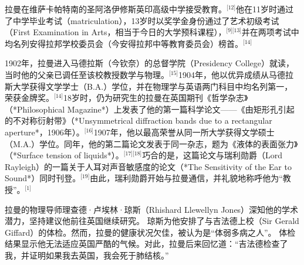 拉曼在维萨卡帕特南的圣阿洛伊修斯英印高级中学接受教育。\(^\text{[12]}\)他在11岁时通过了中学毕业考试（matriculation），13岁时以奖学金身份通过了艺术初级考试（First Examination in Arts，相当于今日的大学预科课程），\(^\text{[9][13]}\)并在两项考试中均名列安得拉邦学校委员会（今安得拉邦中等教育委员会）榜首。\(^\text{[14]}\)

1902年，拉曼进入马德拉斯（今钦奈）的总督学院（Presidency College）就读，当时他的父亲已调任至该校教授数学与物理。\(^\text{[15]}\)1904年，他以优异成绩从马德拉斯大学获得文学学士（B.A.）学位，并在物理学与英语两门科目中均名列第一，荣获金牌奖。\(^\text{[14]}\)18岁时，仍为研究生的拉曼在英国期刊《哲学杂志》（*Philosophical Magazine*）上发表了他的第一篇科学论文——《由矩形孔引起的不对称衍射带》（*Unsymmetrical diffraction bands due to a rectangular aperture*，1906年）。\(^\text{[16]}\)1907年，他以最高荣誉从同一所大学获得文学硕士（M.A.）学位。同年，他的第二篇论文发表于同一杂志，题为《液体的表面张力》（*Surface tension of liquids*）。\(^\text{[17][18]}\)巧合的是，这篇论文与瑞利勋爵（Lord Rayleigh）的一篇关于人耳对声音敏感度的论文（*The Sensitivity of the Ear to Sound*）同时刊登。\(^\text{[19]}\)由此，瑞利勋爵开始与拉曼通信，并礼貌地称呼他为“教授”。\(^\text{[1]}\)

拉曼的物理导师理查德·卢埃林·琼斯（Rhishard Llewellyn Jones）深知他的学术潜力，坚持建议他前往英国继续研究。
琼斯为他安排了与吉法德上校（Sir Gerald Giffard）的体检。然而，拉曼的健康状况欠佳，被认为是“体弱多病之人”。
体检结果显示他无法适应英国严酷的气候。对此，拉曼后来回忆道：“吉法德检查了我，并证明如果我去英国，我会死于肺结核。”
